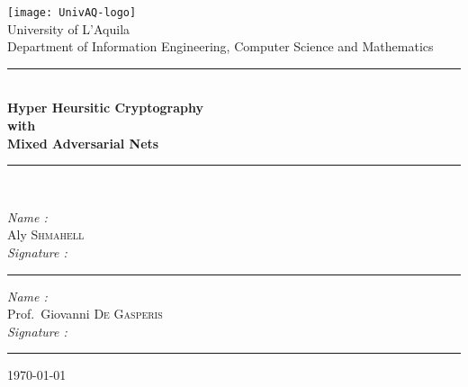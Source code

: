 \documentclass[a4paper, 12pt]{report}
\newcommand\tab[1][1cm]{\hspace*{#1}}
\begin{document}
\begin{titlepage}
	\begin{center}
		\texttt{[image: UnivAQ-logo]}\\[1cm]
		{\LARGE University of L'Aquila}\\[0.5cm]
		{\large Department of Information Engineering, Computer Science and Mathematics}\\[0.5cm]
		\rule{\linewidth}{0.5mm} \\[0.4cm]
		{\huge \bfseries Hyper Heursitic Cryptography\\
			with\\
			Mixed Adversarial Nets \\[0.4cm] }
		\rule{\linewidth}{0.5mm} \\[0.5cm]
		\noindent
			\begin{tcbraster}[raster columns=2,raster rows=1,
				enhanced,size=small,fit algorithm=hybrid* ]
					\begin{tcolorbox}[
						colback=white,
						sharp corners = northwest,
						title={Author}
						]
							\large
							\emph{Name :} \\[0.2cm]
							\tab Aly \textsc{Shmahell}\\[1cm]
							\emph{Signature :}\\[0.8cm]
							\rule{\linewidth}{0.5mm}
					\end{tcolorbox}
					\begin{tcolorbox}[
						colback=white,
						sharp corners = northwest,
						title = {Supervisor}
						]
							\large
							\emph{Name :} \\[0.2cm]
							\tab Prof.~Giovanni \textsc{De Gasperis}\\[1cm]
							\emph{Signature :}\\[0.8cm]
							\rule{\linewidth}{0.5mm}
					\end{tcolorbox}
			\end{tcbraster}
			\vfill
		\today
	\end{center}
\end{titlepage}
\end{document}
